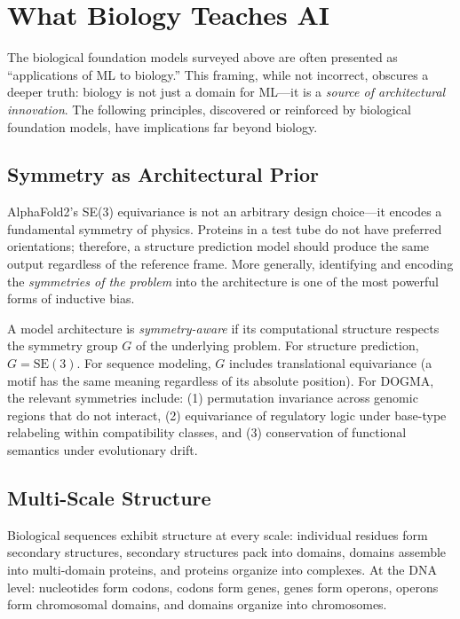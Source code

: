 \section{What Biology Teaches AI}
\label{sec:bio-teaches-ai}

The biological foundation models surveyed above are often presented as ``applications of ML to biology.'' This framing, while not incorrect, obscures a deeper truth: biology is not just a domain for ML---it is a \emph{source of architectural innovation}. The following principles, discovered or reinforced by biological foundation models, have implications far beyond biology.

\subsection{Symmetry as Architectural Prior}

AlphaFold2's SE(3) equivariance is not an arbitrary design choice---it encodes a fundamental symmetry of physics. Proteins in a test tube do not have preferred orientations; therefore, a structure prediction model should produce the same output regardless of the reference frame. More generally, identifying and encoding the \emph{symmetries of the problem} into the architecture is one of the most powerful forms of inductive bias.

\begin{dogmadef}
A model architecture is \emph{symmetry-aware} if its computational structure respects the symmetry group $G$ of the underlying problem. For structure prediction, $G = \mathrm{SE}(3)$. For sequence modeling, $G$ includes translational equivariance (a motif has the same meaning regardless of its absolute position). For DOGMA, the relevant symmetries include: (1) permutation invariance across genomic regions that do not interact, (2) equivariance of regulatory logic under base-type relabeling within compatibility classes, and (3) conservation of functional semantics under evolutionary drift.
\end{dogmadef}

\subsection{Multi-Scale Structure}

Biological sequences exhibit structure at every scale: individual residues form secondary structures, secondary structures pack into domains, domains assemble into multi-domain proteins, and proteins organize into complexes. At the DNA level: nucleotides form codons, codons form genes, genes form operons, operons form chromosomal domains, and domains organize into chromosomes.

